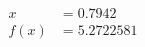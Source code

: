 \documentclass[preview]{standalone}
\begin{document}
\begin{align*}
x &= 0.7942\\f(x) &= 5.2722581
\end{align*}
\end{document}
